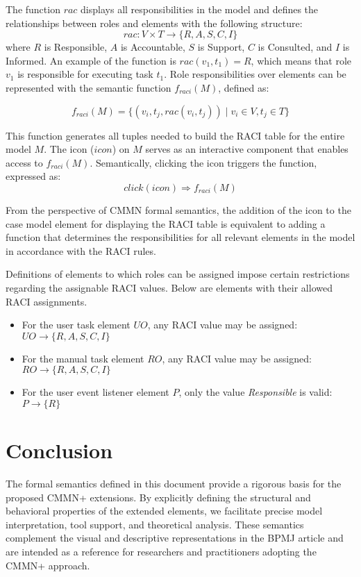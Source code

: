 \documentclass{article}
\begin{document}
The function \( rac \) displays all responsibilities in the model and defines the relationships between roles and elements with the following structure: 
\[
rac : V \times T \rightarrow \{ R, A, S, C, I \}
\]
where \( R \) is Responsible, \( A \) is Accountable, \( S \) is Support, \( C \) is Consulted, and \( I \) is Informed. An example of the function is \( rac(v_1, t_1) = R \), which means that role \( v_1 \) is responsible for executing task \( t_1 \). Role responsibilities over elements can be represented with the semantic function \( f_{raci}(M) \), defined as:

\[
f_{raci}(M) = \{ (v_i, t_j, rac(v_i, t_j)) \mid v_i \in V, t_j \in T \}
\]

This function generates all tuples needed to build the RACI table for the entire model \( M \). The icon (\( icon \)) on \( M \) serves as an interactive component that enables access to \( f_{raci}(M) \). Semantically, clicking the icon triggers the function, expressed as: 
\[
click(icon) \Rightarrow f_{raci}(M)
\]

From the perspective of CMMN formal semantics, the addition of the icon to the case model element for displaying the RACI table is equivalent to adding a function that determines the responsibilities for all relevant elements in the model in accordance with the RACI rules.

Definitions of elements to which roles can be assigned impose certain restrictions regarding the assignable RACI values. Below are elements with their allowed RACI assignments.
\begin{itemize}
    \item For the user task element \( UO \), any RACI value may be assigned: \\
    \( UO \rightarrow \{ R, A, S, C, I \} \)
    \item For the manual task element \( RO \), any RACI value may be assigned: \\
    \( RO \rightarrow \{ R, A, S, C, I \} \)
    \item For the user event listener element \( P \), only the value \textit{Responsible} is valid: \\
    \( P \rightarrow \{ R \} \)
\end{itemize}

\section{Conclusion}
The formal semantics defined in this document provide a rigorous basis for the proposed CMMN+ extensions. By explicitly defining the structural and behavioral properties of the extended elements, we facilitate precise model interpretation, tool support, and theoretical analysis. These semantics complement the visual and descriptive representations in the BPMJ article and are intended as a reference for researchers and practitioners adopting the CMMN+ approach.
\end{document}
